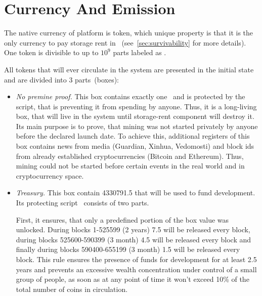 \section{Currency And Emission}
\label{sec:currency}


The native currency of \Ergo{} platform is \Erg{} token, which unique property is
that it is the only currency to pay storage rent in \Ergo{}~(see~\ref{sec:survivability} for more details).
One \Erg{} token is divisible to up to $10^9$ parts labeled as \nanoErg{}.

All \Erg{} tokens that will ever circulate in the system are presented in the
initial state and are divided into 3 parts~(boxes):

\begin{itemize}
    \item{\em No premine proof.} This box contains exactly one~\Erg{} and is protected by the script,
    that is preventing it from spending by anyone.
    Thus, it is a long-living box, that will live in the system until storage-rent component will
    destroy it.
    Its main purpose is to prove, that \Ergo{} mining was not started privately by anyone before
    the declared launch date.
    To achieve this, additional registers of this box contains news from media (Guardian, Xinhua, Vedomosti)
    and block ids from already established cryptocurrencies (Bitcoin and Ethereum).
    Thus, \Ergo{} mining could not be started before certain events in the real world and in
    cryptocurrency space.

    \item{\em Treasury.} This box contain 4330791.5 \Erg{} that will be used to fund \Ergo{}
    development.
    Its protecting script~\cite{link to corresponding ergo tree} consists of two parts.

    First, it ensures, that only a predefined portion of the box value was unlocked.
    During blocks 1-525599 (2 years) 7.5 \Erg{} will be released every block,
    during blocks 525600-590399 (3 month) 4.5 \Erg{} will be released every block and finally
    during blocks 590400-655199 (3 month) 1.5 \Erg{} will be released every block.
    This rule ensures the presence of funds for \Ergo{} development for at least 2.5 years and
    prevents an excessive wealth concentration under control of a small group of people, as soon
    as at any point of time it won't exceed 10\% of the total number of coins in circulation.


\end{itemize}
